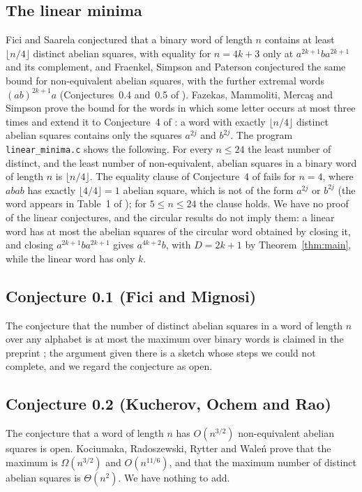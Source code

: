 \documentclass[11pt,reqno]{amsart}
\theoremstyle{definition}
\newcommand{\fl}[1]{\lfloor #1\rfloor}
\begin{document}
\subsection{The linear minima}\label{ssec:linear}
Fici and Saarela conjectured that a binary word of length $n$ contains at least $\fl{n/4}$ distinct abelian squares, with equality for $n=4k+3$ only at $a^{2k+1}ba^{2k+1}$ and its complement, and Fraenkel, Simpson and Paterson conjectured the same bound for non-equivalent abelian squares, with the further extremal words $(ab)^{2k+1}a$ (Conjectures~0.4 and~0.5 of \cite{Sim18}). Fazekas, Mammoliti, Merca\c{s} and Simpson \cite{FMMS26} prove the bound for the words in which some letter occurs at most three times and extend it to Conjecture~4 of \cite{FMMS26}: a word with exactly $\fl{n/4}$ distinct abelian squares contains only the squares $a^{2j}$ and $b^{2j}$. The program \texttt{linear\_minima.c} shows the following. For every $n\le 24$ the least number of distinct, and the least number of non-equivalent, abelian squares in a binary word of length $n$ is $\fl{n/4}$. The equality clause of Conjecture~4 of \cite{FMMS26} fails for $n=4$, where $abab$ has exactly $\fl{4/4}=1$ abelian square, which is not of the form $a^{2j}$ or $b^{2j}$ (the word appears in Table~1 of \cite{FMMS26}); for $5\le n\le 24$ the clause holds. We have no proof of the linear conjectures, and the circular results do not imply them: a linear word has at most the abelian squares of the circular word obtained by closing it, and closing $a^{2k+1}ba^{2k+1}$ gives $a^{4k+2}b$, with $D=2k+1$ by Theorem~\ref{thm:main}, while the linear word has only $k$.

\subsection{Conjecture 0.1 (Fici and Mignosi)}
The conjecture that the number of distinct abelian squares in a word of length $n$ over any alphabet is at most the maximum over binary words is claimed in the preprint \cite{Tri19}; the argument given there is a sketch whose steps we could not complete, and we regard the conjecture as open.

\subsection{Conjecture 0.2 (Kucherov, Ochem and Rao)}
The conjecture that a word of length $n$ has $O(n^{3/2})$ non-equivalent abelian squares is open. Kociumaka, Radoszewski, Rytter and Wale\'n \cite{KRRW16} prove that the maximum is $\Omega(n^{3/2})$ and $O(n^{11/6})$, and that the maximum number of distinct abelian squares is $\Theta(n^2)$. We have nothing to add.
\end{document}
